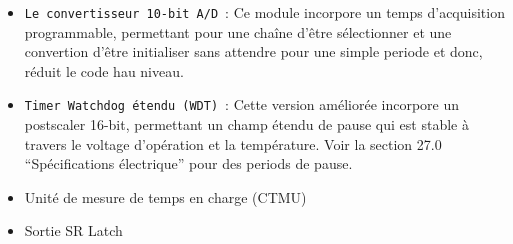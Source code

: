 \documentclass[a4paper, 12pt]{book}
\newcounter{program}[subsection]
\begin{document}
\begin{itemize}
\item \texttt{Le convertisseur 10-bit A/D}~:
Ce module incorpore un temps d’acquisition programmable, permettant pour une chaîne d’être sélectionner et une convertion d’être initialiser sans attendre pour une simple periode et donc, réduit le code hau niveau.
\item \texttt{Timer Watchdog étendu (WDT)}~:
Cette version améliorée incorpore un postscaler 16-bit, permettant un champ étendu de pause qui est stable à travers le voltage d’opération et la température. Voir la section 27.0 “Spécifications électrique” pour des periods de pause.
\item Unité de mesure de temps en charge (CTMU)
\item Sortie SR Latch\\
\end{itemize}
\end{document}
